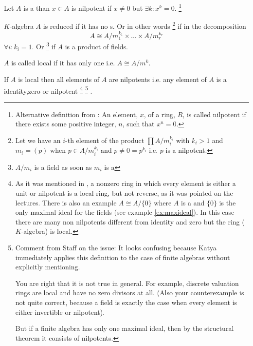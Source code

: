 \begin{definition}
  Let $A$ is a  than $x \in A$ is nilpotent if $x \ne 0$ but
  $\exists k: x^k = 0$.
  \footnote{
    Alternative definition from \cite{wiki:nilpotent}: An element,
    $x$, of a ring, $R$, is called nilpotent if there exists 
    some positive integer, $n$, such that $x^n = 0$.
  }
  \label{def:nilpotent}
\end{definition}

\begin{definition}[reduced]
  $K$-algebra $A$ is reduced if it has no s.
  Or in other words
  \footnote{
    Let we have an $i$-th element of the product $\prod A/m_i^{k_i}$
    with $k_i > 1$ and $m_i  = (p)$ when 
    $p \in A/m_i^{k_i}$ and $p \ne 0 = p^{k_i}$ i.e. $p$ is a
    nilpotent. 
  }
  if in the decomposition
  \[
  A \cong A/m_1^{k_1} \times \dots \times A/m_r^{k_r}
  \]
  $\forall i: k_i = 1$.
  Or 
  \footnote{
    $A/m_i$ is a field as soon as $m_i$ is a 
  }
  if $A$ is a product of fields. 
  \label{def:reduced}
\end{definition}

\begin{definition}[local]
   $A$ is called local if it has only one
   i.e. $A \cong A/m^k$. 
  \label{def:local}
\end{definition}

If $A$ is local then all elements of $A$ are nilpotents
i.e. any element of $A$ is a identity,zero or nilpotent
\footnote{
  As it was mentioned in \cite{wiki:localring}, a nonzero ring in
  which every element is either a unit or nilpotent is a local
  ring, but not reverse, as it was pointed on the lectures. There is
  also an example $A \cong A/\{0\}$ where $A$ is a 
  and $\{0\}$ is the only maximal ideal for the fields (see example
  \ref{ex:maxideal}). In this case there are many non nilpotents
  different from identity and zero but the ring ($K$-algebra) is local. 
}
\footnote{
  Comment from Staff on the issue: It looks confusing because Katya
  immediately applies this definition to the case of finite algebras
  without explicitly mentioning. 

  You are right that it is not true in general. For example, discrete
  valuation rings are local and have no zero divisors at all. (Also your
  counterexample is not quite correct, because a field is exactly the 
  case when every element is either invertible or nilpotent).  
  
  But if a finite algebra has only one maximal ideal, then by the
  structural theorem it consists of nilpotents. 
}
.

